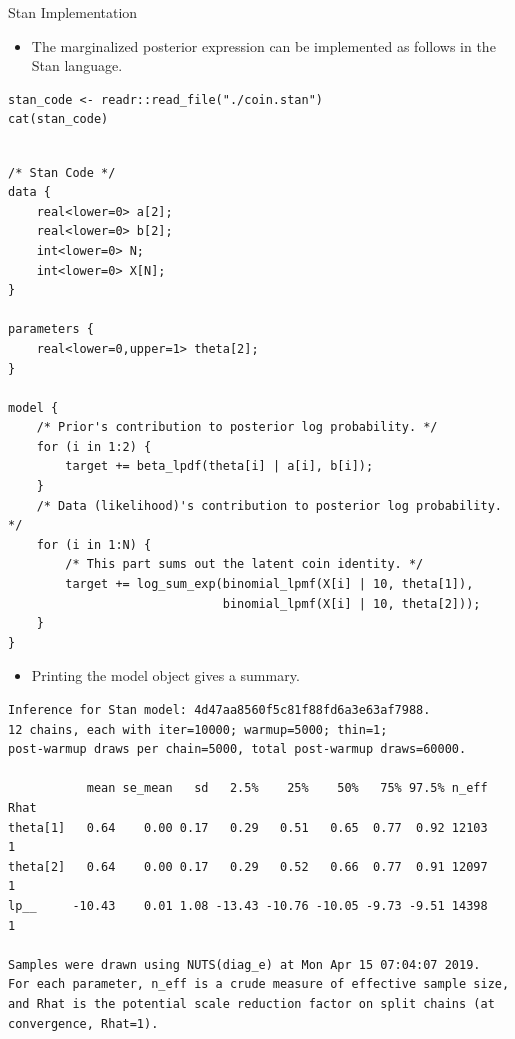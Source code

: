 \documentclass[dvipdfmx,bigger,aspectratio=169]{beamer}
\begin{document}
\begin{frame}[fragile,allowframebreaks,label=,t]{Stan Implementation}
 \begin{itemize}
\item The marginalized posterior expression can be implemented as follows in the Stan language.
\end{itemize}
\scriptsize
\begin{verbatim}
stan_code <- readr::read_file("./coin.stan")
cat(stan_code)
\end{verbatim}

\begin{verbatim}

/* Stan Code */
data {
    real<lower=0> a[2];
    real<lower=0> b[2];
    int<lower=0> N;
    int<lower=0> X[N];
}

parameters {
    real<lower=0,upper=1> theta[2];
}

model {
    /* Prior's contribution to posterior log probability. */
    for (i in 1:2) {
        target += beta_lpdf(theta[i] | a[i], b[i]);
    }
    /* Data (likelihood)'s contribution to posterior log probability. */
    for (i in 1:N) {
        /* This part sums out the latent coin identity. */
        target += log_sum_exp(binomial_lpmf(X[i] | 10, theta[1]),
                              binomial_lpmf(X[i] | 10, theta[2]));
    }
}
\end{verbatim}

\normalsize
\scriptsize
\normalsize
\newpage
\begin{itemize}
\item Printing the model object gives a summary.
\end{itemize}
\scriptsize
\begin{verbatim}
Inference for Stan model: 4d47aa8560f5c81f88fd6a3e63af7988.
12 chains, each with iter=10000; warmup=5000; thin=1; 
post-warmup draws per chain=5000, total post-warmup draws=60000.

           mean se_mean   sd   2.5%    25%    50%   75% 97.5% n_eff Rhat
theta[1]   0.64    0.00 0.17   0.29   0.51   0.65  0.77  0.92 12103    1
theta[2]   0.64    0.00 0.17   0.29   0.52   0.66  0.77  0.91 12097    1
lp__     -10.43    0.01 1.08 -13.43 -10.76 -10.05 -9.73 -9.51 14398    1

Samples were drawn using NUTS(diag_e) at Mon Apr 15 07:04:07 2019.
For each parameter, n_eff is a crude measure of effective sample size,
and Rhat is the potential scale reduction factor on split chains (at 
convergence, Rhat=1).
\end{verbatim}

\normalsize
\end{frame}
\end{document}
